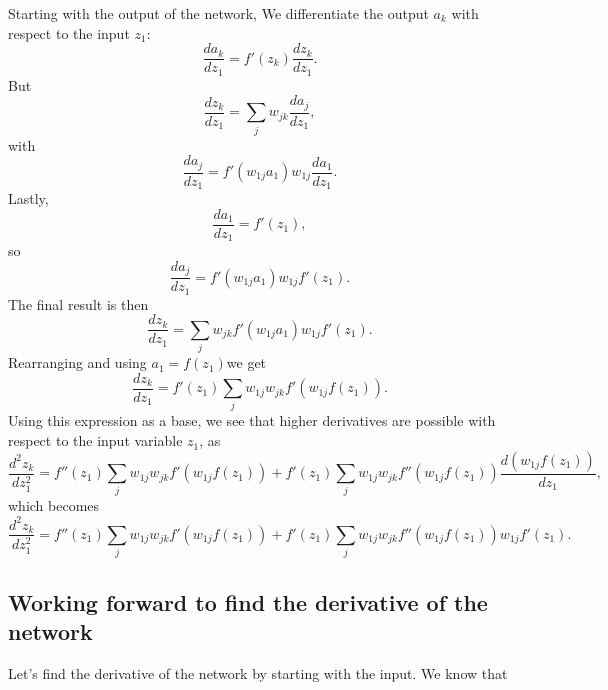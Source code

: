 \documentclass[12pt]{article}
\begin{document}
Starting with the output of the network, We differentiate the output $a_k$ with respect to the input $z_1$:
\begin{equation}
\frac{da_k}{dz_1}=f'(z_k)\frac{dz_k}{dz_1}.
\end{equation}
But 
\begin{equation}
\frac{dz_k}{dz_1}=\sum_j w_{jk}\frac{da_j}{dz_1},
\end{equation}
with 
\begin{equation}
\frac{da_j}{dz_1}=f'(w_{1j}{a_1})w_{1j}\frac{da_1}{dz_1}.
\end{equation}
Lastly,
\begin{equation}
\frac{da_1}{dz_1}=f'(z_1),
\end{equation}
so
\begin{equation}
\frac{da_j}{dz_1}=f'(w_{1j}{a_1})w_{1j}f'(z_1).
\end{equation}
The final result is then
\begin{equation}
\frac{dz_k}{dz_1}=\sum_j w_{jk}f'(w_{1j}{a_1})w_{1j}f'(z_1).
\end{equation}
Rearranging and using $a_1=f(z_1)$we get
\begin{equation}
\frac{dz_k}{dz_1}=f'(z_1)\sum_j w_{1j}w_{jk}f'(w_{1j}{f(z_1)}).
\label{dbase}
\end{equation}
Using this expression as a base, we see that higher derivatives are possible with respect to the input variable $z_1$, as
\begin{equation}
\frac{d^2z_k}{dz_1^2}=f''(z_1)\sum_j w_{1j}w_{jk}f'(w_{1j}{f(z_1)}) + f'(z_1)\sum_j w_{1j}w_{jk}f''\left(w_{1j}f(z_1)\right)\frac{d(w_{1j}f(z_1))}{dz_1},
\end{equation}
which becomes
\begin{equation}
\frac{d^2z_k}{dz_1^2}=f''(z_1)\sum_j w_{1j}w_{jk}f'(w_{1j}{f(z_1)}) + f'(z_1)\sum_j w_{1j}w_{jk}f''\left(w_{1j}f(z_1)\right)w_{1j}f'(z_1).
\end{equation}

\subsection{Working forward to find the derivative of the network}
\label{dforward}

Let's find the derivative of the network by starting with the input. We know that 
\end{document}
